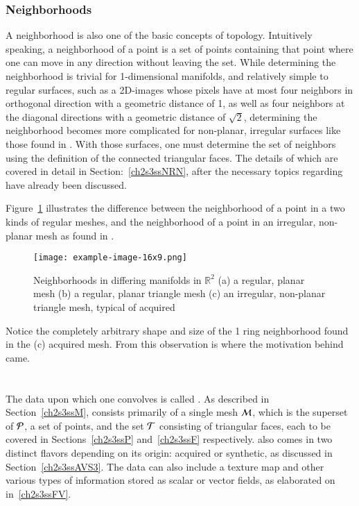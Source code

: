 \subsubsection{Neighborhoods}
A neighborhood is also one of the basic concepts of topology. Intuitively speaking, a neighborhood of a point is a set of points containing that point where one can move in any direction without leaving the set. While determining the neighborhood is trivial for 1-dimensional manifolds, and relatively simple to regular surfaces, such as a 2D-images whose pixels have at most four neighbors in orthogonal direction with a geometric distance of 1, as well as four neighbors at the diagonal directions with a geometric distance of $\sqrt{2}$, determining the neighborhood becomes more complicated for non-planar, irregular surfaces like those found in \tdd{}. With those surfaces, one must determine the set of neighbors using the definition of the connected triangular faces. The details of which are covered in detail in Section:~\ref{ch2s3ssNRN}, after the necessary topics regarding \tdd{} have already been discussed.

Figure~\ref{fig:neighborhoods} illustrates the difference between the neighborhood of a point in a two kinds of regular meshes, and the neighborhood of a point in an irregular, non-planar mesh as found in \tdd{}.
%
\begin{figure}
\ffigbox
	{\texttt{[image: example-image-16x9.png]}}
	{\caption[Regular Planar and Irregular Non-planar Neighborhoods in $\mathbb{R}^2$]{Neighborhoods in differing manifolds in $\mathbb{R}^2$ (a) a regular, planar mesh (b) a regular, planar triangle mesh (c) an irregular, non-planar triangle mesh, typical of acquired \tdd{}}\label{fig:neighborhoods}}
\end{figure}
%
Notice the completely arbitrary shape and size of the 1 ring neighborhood found in the (c) acquired mesh. From this observation is where the motivation behind  came.
%
%
%
%
%
\section{\tdd}
\label{ch2s3}
The data upon which one convolves  is called \tdd{}. As described in Section~\ref{ch2s3ssM}, \tdd{} consists primarily of a single mesh $\mathcal{M}$, which is the superset of $\mathcal{P}$, a set of points, and the set $\mathcal{T}$ consisting of triangular faces, each to be covered in Sections~\ref{ch2s3ssP} and~\ref{ch2s3ssF} respectively. \tdd{} also comes in two distinct flavors depending on its origin: acquired or synthetic, as discussed in Section~\ref{ch2s3ssAVS3}. The data can also include a texture map and other various types of information stored as scalar or vector fields, as elaborated on in~\ref{ch2s3ssFV}.
%
